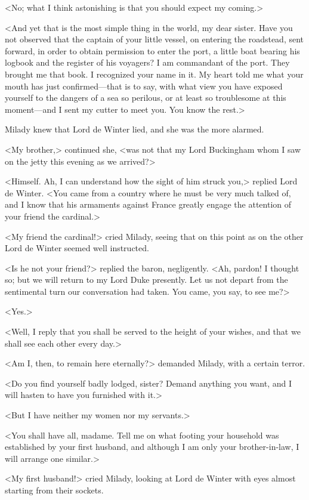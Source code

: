 <No; what I think astonishing is that you should expect my coming.> 

<And yet that is the most simple thing in the world, my dear sister. Have you not observed that the captain of your little vessel, on entering the roadstead, sent forward, in order to obtain permission to enter the port, a little boat bearing his logbook and the register of his voyagers? I am commandant of the port. They brought me that book. I recognized your name in it. My heart told me what your mouth has just confirmed—that is to say, with what view you have exposed yourself to the dangers of a sea so perilous, or at least so troublesome at this moment—and I sent my cutter to meet you. You know the rest.> 

Milady knew that Lord de Winter lied, and she was the more alarmed. 

<My brother,> continued she, <was not that my Lord Buckingham whom I saw on the jetty this evening as we arrived?> 

<Himself. Ah, I can understand how the sight of him struck you,> replied Lord de Winter. <You came from a country where he must be very much talked of, and I know that his armaments against France greatly engage the attention of your friend the cardinal.> 

<My friend the cardinal!> cried Milady, seeing that on this point as on the other Lord de Winter seemed well instructed. 

<Is he not your friend?> replied the baron, negligently. <Ah, pardon! I thought so; but we will return to my Lord Duke presently. Let us not depart from the sentimental turn our conversation had taken. You came, you say, to see me?> 

<Yes.> 

<Well, I reply that you shall be served to the height of your wishes, and that we shall see each other every day.> 

<Am I, then, to remain here eternally?> demanded Milady, with a certain terror. 

<Do you find yourself badly lodged, sister? Demand anything you want, and I will hasten to have you furnished with it.> 

<But I have neither my women nor my servants.> 

<You shall have all, madame. Tell me on what footing your household was established by your first husband, and although I am only your brother-in-law, I will arrange one similar.> 

<My first husband!> cried Milady, looking at Lord de Winter with eyes almost starting from their sockets. 

